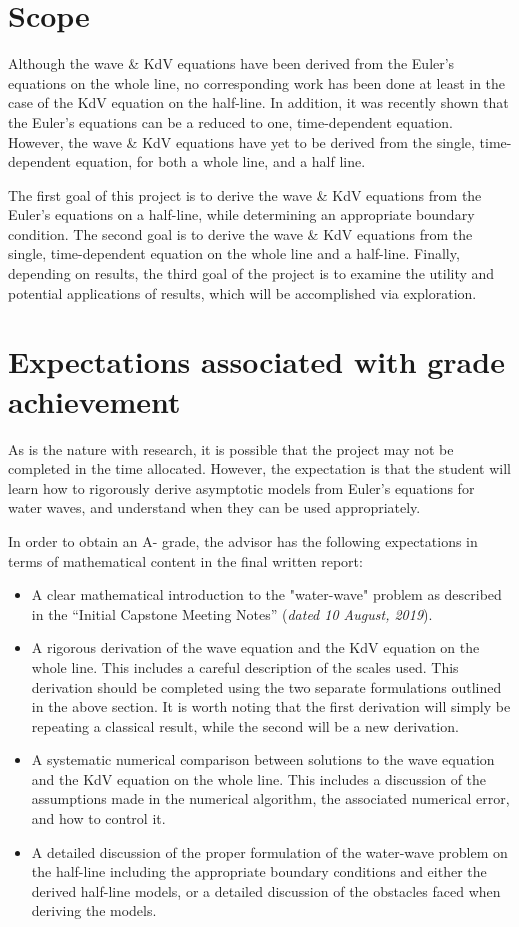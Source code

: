 \documentclass[10pt, oneside, a4paper]{article}
\begin{document}
\section{Scope}
Although the wave \& KdV equations have been derived from the Euler's equations on the whole line, no corresponding work has been done at least in the case of the KdV equation on the half-line. In addition, it was recently shown that the Euler's equations can be a reduced to one, time-dependent equation. However, the wave \& KdV equations have yet to be derived from the single, time-dependent equation, for both a whole line, and a half line.

The first goal of this project is to derive the wave \& KdV equations from the Euler's equations on a half-line, while determining an appropriate boundary condition. The second goal is to derive the wave \& KdV equations from the single, time-dependent equation on the whole line and a half-line. Finally, depending on results, the third goal of the project is to examine the utility and potential applications of results, which will be accomplished via exploration. 

\section{Expectations associated with grade achievement}
As is the nature with research, it is possible that the project may not be completed in the time allocated.  However, the expectation is that the student will learn how to rigorously derive asymptotic models from Euler's equations for water waves, and understand when they can be used appropriately.  

In order to obtain an A- grade, the advisor has the following expectations in terms of mathematical content in the final written report:
\begin{itemize}
    \item A clear mathematical introduction to the "water-wave" problem as described in the ``Initial Capstone Meeting Notes'' (\emph{dated 10 August, 2019}).
    \item A rigorous derivation of the wave equation and the KdV equation on the whole line.  This includes a careful description of the scales used. This derivation should be completed using the two separate formulations outlined in the above section.  It is worth noting that the first derivation will simply be repeating a classical result, while the second will be a new derivation.
    \item A systematic numerical comparison between solutions to the wave equation and the KdV equation on the whole line. This includes a discussion of the assumptions made in the numerical algorithm, the associated numerical error, and how to control it.
    \item A detailed discussion of the proper formulation of the water-wave problem on the half-line including the appropriate boundary conditions and either the derived half-line models, or a detailed discussion of the obstacles faced when deriving the models.  
\end{itemize} 
\end{document}
